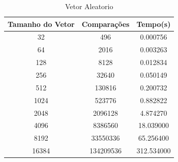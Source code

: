 \documentclass[12pt,a4paper,twoside]{report}
\begin{document}
\begin{table}[h]
  \centering
  \caption{Vetor Aleatorio \label{tab:aleatorio}}
  \begin{tabular}{ccc} \\\hline
  \textbf{Tamanho do Vetor} & \textbf{Comparações} & \textbf{Tempo(s)} \\\hline
  32                        & 496                  & 0.000756          \\\hline
  64                        & 2016                 & 0.003263          \\\hline
  128                       & 8128                 & 0.012834          \\\hline
  256                       & 32640                & 0.050149          \\\hline
  512                       & 130816               & 0.200732          \\\hline
  1024                      & 523776               & 0.882822          \\\hline
  2048                      & 2096128              & 4.874270          \\\hline
  4096                      & 8386560              & 18.039000         \\\hline
  8192                      & 33550336             & 65.256400         \\\hline
  16384                     & 134209536            & 312.534000       \\\hline
  \end{tabular}
\end{table}
\end{document}
